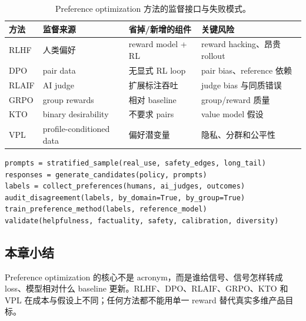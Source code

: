
\begin{table}[H]
\centering
\small
\begin{tabularx}{\textwidth}{L{0.13\textwidth} L{0.20\textwidth} X X}
\toprule
方法 & 监督来源 & 省掉/新增的组件 & 关键风险 \\
\midrule
RLHF & 人类偏好 & reward model + RL & reward hacking、昂贵 rollout \\
DPO & pair data & 无显式 RL loop & pair bias、reference 依赖 \\
RLAIF & AI judge & 扩展标注吞吐 & judge bias 与同质错误 \\
GRPO & group rewards & 相对 baseline & group/reward 质量 \\
KTO & binary desirability & 不要求 pairs & value model 假设 \\
VPL & profile-conditioned data & 偏好潜变量 & 隐私、分群和公平性 \\
\bottomrule
\end{tabularx}
\caption{Preference optimization 方法的监督接口与失败模式。}
\end{table}

\begin{lstlisting}[caption={Preference data pipeline 的最小审计骨架}]
prompts = stratified_sample(real_use, safety_edges, long_tail)
responses = generate_candidates(policy, prompts)
labels = collect_preferences(humans, ai_judges, outcomes)
audit_disagreement(labels, by_domain=True, by_group=True)
train_preference_method(labels, reference_model)
validate(helpfulness, factuality, safety, calibration, diversity)
\end{lstlisting}

\subsection{本章小结}

Preference optimization 的核心不是 acronym，而是谁给信号、信号怎样转成 loss、模型相对什么 baseline 更新。RLHF、DPO、RLAIF、GRPO、KTO 和 VPL 在成本与假设上不同；任何方法都不能用单一 reward 替代真实多维产品目标。

